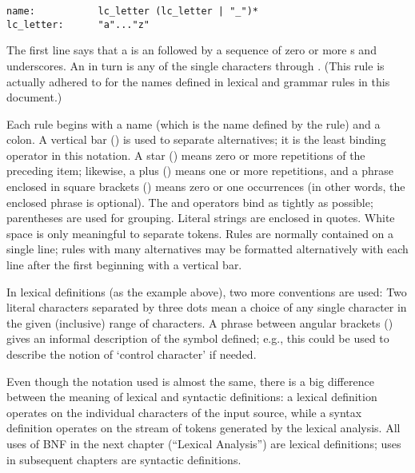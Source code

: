 \begin{verbatim}
name:           lc_letter (lc_letter | "_")*
lc_letter:      "a"..."z"
\end{verbatim}

The first line says that a  is an  followed by
a sequence of zero or more s and underscores.  An
 in turn is any of the single characters 
through .  (This rule is actually adhered to for the
names defined in lexical and grammar rules in this document.)

Each rule begins with a name (which is the name defined by the rule)
and a colon.  A vertical bar (\code{|}) is used to separate
alternatives; it is the least binding operator in this notation.  A
star (\code{*}) means zero or more repetitions of the preceding item;
likewise, a plus (\code{+}) means one or more repetitions, and a
phrase enclosed in square brackets (\code{[ ]}) means zero or one
occurrences (in other words, the enclosed phrase is optional).  The
\code{*} and \code{+} operators bind as tightly as possible;
parentheses are used for grouping.  Literal strings are enclosed in
quotes.  White space is only meaningful to separate tokens.
Rules are normally contained on a single line; rules with many
alternatives may be formatted alternatively with each line after the
first beginning with a vertical bar.

In lexical definitions (as the example above), two more conventions
are used: Two literal characters separated by three dots mean a choice
of any single character in the given (inclusive) range of \ASCII{}
characters.  A phrase between angular brackets () gives an
informal description of the symbol defined; e.g., this could be used
to describe the notion of `control character' if needed.

Even though the notation used is almost the same, there is a big
difference between the meaning of lexical and syntactic definitions:
a lexical definition operates on the individual characters of the
input source, while a syntax definition operates on the stream of
tokens generated by the lexical analysis.  All uses of BNF in the next
chapter (``Lexical Analysis'') are lexical definitions; uses in
subsequent chapters are syntactic definitions.
